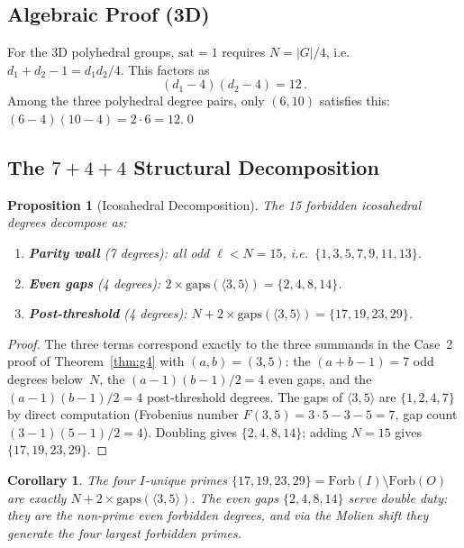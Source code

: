 \documentclass[11pt,letterpaper]{article}
\newtheorem{proposition}[theorem]{Proposition}
\newtheorem{corollary}[theorem]{Corollary}
\theoremstyle{definition}
\newcommand{\Forb}{\mathrm{Forb}}
\newcommand{\abs}[1]{\lvert #1 \rvert}
\newcommand{\gen}[1]{\langle #1 \rangle}
\begin{document}
\subsection{Algebraic Proof (3D)}
For the 3D polyhedral groups, $\mathrm{sat}=1$ requires $N=\abs{G}/4$, i.e.\ $d_1+d_2-1=d_1 d_2/4$.  This factors as
\begin{equation}\label{eq:uniqueness}
  \boxed{(d_1-4)(d_2-4)=12\,.}
\end{equation}
Among the three polyhedral degree pairs, only $(6,10)$ satisfies this: $(6{-}4)(10{-}4)=2\cdot6=12$.\qed
\subsection{The \texorpdfstring{$7+4+4$}{7+4+4} Structural Decomposition}\label{sec:decomposition}
\begin{proposition}[Icosahedral Decomposition]\label{prop:decomp}
The 15 forbidden icosahedral degrees decompose as:
\begin{enumerate}[label=\textup{(\roman*)}]
  \item \textbf{Parity wall} \textup{(7 degrees)}: all odd $\ell<N=15$, i.e.\ $\{1,3,5,7,9,11,13\}$.
  \item \textbf{Even gaps} \textup{(4 degrees)}: $2\times\mathrm{gaps}(\gen{3,5})=\{2,4,8,14\}$.
  \item \textbf{Post-threshold} \textup{(4 degrees)}: $N+2\times\mathrm{gaps}(\gen{3,5})=\{17,19,23,29\}$.
\end{enumerate}
\end{proposition}
\begin{proof}
The three terms correspond exactly to the three summands in the Case~2 proof of Theorem~\ref{thm:g4} with $(a,b)=(3,5)$: the $(a{+}b{-}1)=7$ odd degrees below~$N$, the $(a{-}1)(b{-}1)/2=4$ even gaps, and the $(a{-}1)(b{-}1)/2=4$ post-threshold degrees.  The gaps of $\gen{3,5}$ are $\{1,2,4,7\}$ by direct computation (Frobenius number $F(3,5)=3\cdot5-3-5=7$, gap count $(3{-}1)(5{-}1)/2=4$).  Doubling gives $\{2,4,8,14\}$; adding $N=15$ gives $\{17,19,23,29\}$.
\end{proof}
\begin{corollary}\label{cor:iunique}
The four $I$-unique primes $\{17,19,23,29\}=\Forb(I)\setminus\Forb(O)$ are exactly $N+2\times\mathrm{gaps}(\gen{3,5})$.  The even gaps $\{2,4,8,14\}$ serve double duty: they are the non-prime even forbidden degrees, and via the Molien shift they generate the four largest forbidden primes.
\end{corollary}
\end{document}
